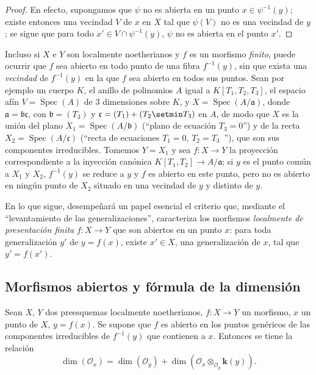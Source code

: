\begin{proof}
En efecto, supongamos que $\psi$ no es abierta en un punto $x\in\psi^{-1}(y)$; existe entonces una vecindad $V$ de $x$ en $X$ tal que $\psi(V)$ no es una vecindad de $y$; se sigue que para todo $x'\in V\cap\psi^{-1}(y)$, $\psi$ no es abierta en el punto $x'$.
\end{proof}

\begin{remark}[14.1.5]
\label{IV.14.1.5}
Incluso si $X$ e $Y$ son localmente noetherianos y $f$ es un morfismo \emph{finito}, puede ocurrir que $f$ sea abierto en todo punto de una fibra $f^{-1}(y)$, sin que exista una \emph{vecindad} de $f^{-1}(y)$ en la que $f$ sea abierto en todos sus puntos.
Sean por ejemplo un cuerpo $K$, el anillo de polinomios $A$ igual a $K[T_1,T_2,T_3]$, el espacio afín $V=\operatorname{Spec}(A)$ de 3 dimensiones sobre $K$, y $X=\operatorname{Spec}(A/\mathfrak a)$, donde $\mathfrak a=\mathfrak b\mathfrak c$, con $\mathfrak b=(T_3)$ y $\mathfrak c=(T_1)+(T_2\setmin T_3)$ en $A$, de modo que $X$ es la unión del plano $X_1=\operatorname{Spec}(A/\mathfrak b)$ (``plano de ecuación $T_3=0$'') y de la recta $X_2=\operatorname{Spec}(A/\mathfrak c)$ (``recta de ecuaciones $T_1=0$, $T_2=T_3$~''), que son sus componentes irreducibles.
Tomemos $Y=X_1$ y sea $f:X\to Y$ la proyección correspondiente a la inyección canónica $K[T_1,T_2]\to A/\mathfrak a$; si $y$ es el punto común a $X_1$ y $X_2$, $f^{-1}(y)$ se reduce a $y$ y $f$ es abierto en este punto, pero no es abierto en ningún punto de $X_2$ situado en una vecindad de $y$ y distinto de $y$.
\end{remark}

\begin{env}[14.1.6]
\label{IV.14.1.6}
En lo que sigue, desempeñará un papel esencial el criterio  que, mediante el ``levantamiento de las generalizaciones'', caracteriza los morfismos \emph{localmente de presentación finita} $f:X\to Y$ que son abiertos en un punto $x$: para toda generalización $y'$ de $y=f(x)$, existe $x'\in X$, una generalización de $x$, tal que $y'=f(x')$.
\end{env}

\subsection{Morfismos abiertos y fórmula de la dimensión}
\label{subsection:IV.14.2}

\begin{theorem}[14.2.1]
\label{IV.14.2.1}
Sean $X$, $Y$ dos preesquemas localmente noetherianos, $f:X\to Y$ un morfismo, $x$ un punto de $X$, $y=f(x)$.
Se supone que $f$ es abierto en los puntos genéricos de las componentes irreducibles de $f^{-1}(y)$ que contienen a $x$.
Entonces se tiene la relación
\begin{equation}
\tag{14.2.1.1}
\label{IV.14.2.1.1-fr}
  \dim(\mathcal O_x)=\dim(\mathcal O_y)+
  \dim(\mathcal O_x\otimes_{\mathcal O_y}\boldsymbol{k}(y)).
\end{equation}
\end{theorem}


